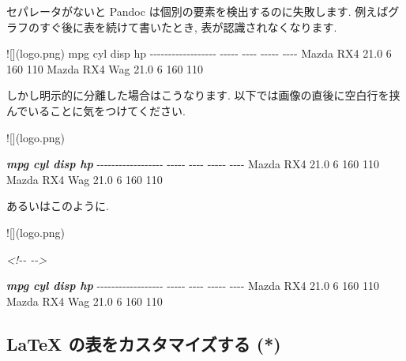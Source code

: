 \documentclass[
  11pt,
  lualatex,ja=standard,jafont=noto]{bxjsreport}
\newenvironment{Shaded}{\begin{snugshade}}{\end{snugshade}}
\newcommand{\AlertTok}[1]{\textcolor[rgb]{0.94,0.16,0.16}{#1}}
\newcommand{\CommentTok}[1]{\textcolor[rgb]{0.56,0.35,0.01}{\textit{#1}}}
\newcommand{\InformationTok}[1]{\textcolor[rgb]{0.56,0.35,0.01}{\textbf{\textit{#1}}}}
\newcommand{\NormalTok}[1]{#1}
\begin{document}
セパレータがないと Pandoc は個別の要素を検出するのに失敗します. 例えばグラフのすぐ後に表を続けて書いたとき, 表が認識されなくなります.

\begin{Shaded}
\begin{Highlighting}[]
\AlertTok{![](logo.png)}
\NormalTok{                      mpg   cyl   disp    hp}
\NormalTok{{-}{-}{-}{-}{-}{-}{-}{-}{-}{-}{-}{-}{-}{-}{-}{-}{-}{-}  {-}{-}{-}{-}{-}  {-}{-}{-}{-}  {-}{-}{-}{-}{-}  {-}{-}{-}{-}}
\NormalTok{Mazda RX4            21.0     6    160   110}
\NormalTok{Mazda RX4 Wag        21.0     6    160   110}
\end{Highlighting}
\end{Shaded}

しかし明示的に分離した場合はこうなります. 以下では画像の直後に空白行を挟んでいることに気をつけてください.

\begin{Shaded}
\begin{Highlighting}[]
\AlertTok{![](logo.png)}

\InformationTok{                      mpg   cyl   disp    hp}
\NormalTok{{-}{-}{-}{-}{-}{-}{-}{-}{-}{-}{-}{-}{-}{-}{-}{-}{-}{-}  {-}{-}{-}{-}{-}  {-}{-}{-}{-}  {-}{-}{-}{-}{-}  {-}{-}{-}{-}}
\NormalTok{Mazda RX4            21.0     6    160   110}
\NormalTok{Mazda RX4 Wag        21.0     6    160   110}
\end{Highlighting}
\end{Shaded}

あるいはこのように.

\begin{Shaded}
\begin{Highlighting}[]
\AlertTok{![](logo.png)}

\CommentTok{\textless{}!{-}{-} {-}{-}\textgreater{}}

\InformationTok{                      mpg   cyl   disp    hp}
\NormalTok{{-}{-}{-}{-}{-}{-}{-}{-}{-}{-}{-}{-}{-}{-}{-}{-}{-}{-}  {-}{-}{-}{-}{-}  {-}{-}{-}{-}  {-}{-}{-}{-}{-}  {-}{-}{-}{-}}
\NormalTok{Mazda RX4            21.0     6    160   110}
\NormalTok{Mazda RX4 Wag        21.0     6    160   110}
\end{Highlighting}
\end{Shaded}

\hypertarget{customize-latex-tables}{%
\subsection{LaTeX の表をカスタマイズする (*)}\label{customize-latex-tables}}
\end{document}
